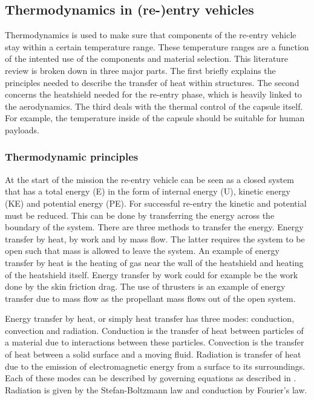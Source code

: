 \subsection{Thermodynamics in (re-)entry vehicles}\label{sec:thermo}
Thermodynamics is used to make sure that components of the re-entry vehicle stay within a certain temperature range. These temperature ranges are a function of the intented use of the components and material selection. This literature review is broken down in three major parts. The first briefly explains the principles needed to describe the transfer of heat within structures. The second concerns the heatshield needed for the re-entry phase, which is heavily linked to the aerodynamics. The third deals with the thermal control of the capsule itself. For example, the temperature inside of the capsule should be suitable for human payloads.

\subsubsection{Thermodynamic principles}
At the start of the mission the re-entry vehicle can be seen as a closed system that has a total energy (E) in the form of internal energy (U), kinetic energy (KE) and potential energy (PE). For successful re-entry the kinetic and potential must be reduced. This can be done by transferring the energy across the boundary of the system. There are three methods to transfer the energy. Energy transfer by heat, by work and by mass flow. The latter requires the system to be open such that mass is allowed to leave the system. \cite{Cengel2010} An example of energy transfer by heat is the heating of gas near the wall of the heatshield and heating of the heatshield itself. Energy transfer by work could for example be the work done by the skin friction drag. The use of thrusters is an example of energy transfer due to mass flow as the propellant mass flows out of the open system. 

Energy transfer by heat, or simply heat transfer has three modes: conduction, convection and radiation. Conduction is the transfer of heat between particles of a material due to interactions between these particles. Convection is the transfer of heat between a solid surface and a moving fluid. Radiation is transfer of heat due to the emission of electromagnetic energy from a surface to its surroundings. \cite{Cengel2010}\cite{Karam1998} Each of these modes can be described by governing equations as described in \cite{Holman2002}. Radiation is given by the Stefan-Boltzmann law and conduction by Fourier's law. \cite{Cengel2010}\cite{Holman2002}



